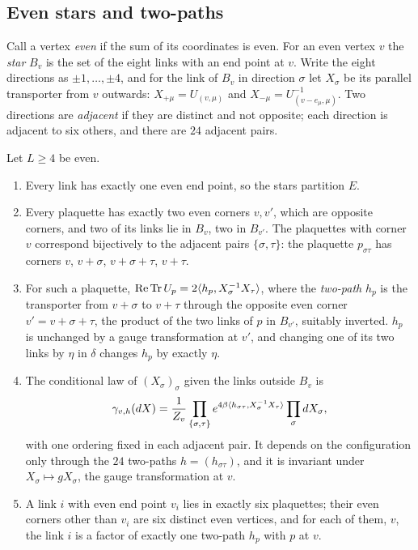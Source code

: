\subsection{Even stars and two-paths}

Call a vertex \emph{even} if the sum of its coordinates is even. For an even
vertex $v$ the \emph{star} $B_v$ is the set of the eight links with an end
point at $v$. Write the eight directions as $\pm1,\dots,\pm4$, and for the link
of $B_v$ in direction $\sigma$ let $X_\sigma$ be its parallel transporter from
$v$ outwards: $X_{+\mu}=U_{(v,\mu)}$ and $X_{-\mu}=U_{(v-e_\mu,\mu)}^{-1}$. Two
directions are \emph{adjacent} if they are distinct and not opposite; each
direction is adjacent to six others, and there are $24$ adjacent pairs.

\begin{lemma}\label{lem:stars}
Let $L\ge4$ be even.
\begin{enumerate}[label=\textup{(\roman*)},leftmargin=*]
\item Every link has exactly one even end point, so the stars partition $E$.
\item Every plaquette has exactly two even corners $v,v'$, which are opposite
corners, and two of its links lie in $B_v$, two in $B_{v'}$. The plaquettes
with corner $v$ correspond bijectively to the adjacent pairs $\{\sigma,\tau\}$:
the plaquette $p_{\sigma\tau}$ has corners $v$, $v+\sigma$, $v+\sigma+\tau$,
$v+\tau$.
\item For such a plaquette, $\operatorname{Re}\operatorname{Tr} U_p=2\langle h_p,X_\sigma^{-1}X_\tau\rangle$, where
the \emph{two-path} $h_p$ is the transporter from $v+\sigma$ to $v+\tau$
through the opposite even corner $v'=v+\sigma+\tau$, the product of the two
links of $p$ in $B_{v'}$, suitably inverted. $h_p$ is unchanged by a gauge
transformation at $v'$, and changing one of its two links by $\eta$ in
$\delta$ changes $h_p$ by exactly $\eta$.
\item The conditional law of $(X_\sigma)_\sigma$ given the links outside $B_v$ is
\[
\gamma_{v,h}(dX)=\frac1{Z_v}\prod_{\{\sigma,\tau\}}e^{4\beta\langle h_{\sigma\tau},X_\sigma^{-1}X_\tau\rangle}\prod_\sigma dX_\sigma ,
\]
with one ordering fixed in each adjacent pair. It depends on the
configuration only through the $24$ two-paths $h=(h_{\sigma\tau})$, and it is
invariant under $X_\sigma\mapsto gX_\sigma$, the gauge transformation at $v$.
\item A link $i$ with even end point $v_i$ lies in exactly six plaquettes;
their even corners other than $v_i$ are six distinct even vertices, and for
each of them, $v$, the link $i$ is a factor of exactly one two-path $h_p$ with
$p$ at $v$.
\end{enumerate}
\end{lemma}


